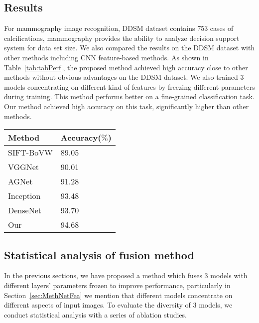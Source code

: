 \subsection{Results}
\label{sec:ExpRes}

For mammography image recognition, DDSM 
dataset contains 753 cases of calcifications, 
mammography provides the ability to analyze 
decision support system for data set size.
We also compared the results 
on the DDSM dataset with other methods 
including CNN feature-based methods. 
As shown in 
Table~\ref{tab:tabPerf},
the proposed method achieved high accuracy 
close to other methods without obvious 
advantages on the DDSM dataset. We also trained 
3 models concentrating on different kind
of features by freezing different 
parameters during training. This method 
performs better on a fine-grained 
classification task. Our method achieved 
high accuracy on this task, significantly 
higher than other methods.

\begin{table*}[!ht]
    \caption{Performance comparing to 
        different methods}
    \label{tab:tabPerf}
    \setlength{\arrayrulewidth}{1.05 pt}
    \renewcommand{\arraystretch}{1.1}
    \begin{tabular*}{1.0\textwidth}{
        @{
            \extracolsep{\fill}
        }ll
    }
        \hline
        Method & Accuracy($\%$) \\
        \hline
        SIFT-BoVW       & 89.05 \\
        VGGNet          & 90.01 \\
        AGNet           & 91.28 \\
        Inception       & 93.48 \\
        DenseNet        & 93.70 \\
        Our             & 94.68 \\
        \hline
    \end{tabular*}
\end{table*}

\subsection{Statistical analysis of fusion method}
\label{ExpSA}

In the previous sections, we have proposed 
a method which fuses 3 models with different 
layers’ parameters frozen to improve 
performance, particularly in 
Section~\ref{sec:MethNetFea} 
we mention that different models 
concentrate on different aspects of input 
images. To evaluate the diversity of 3 
models, we conduct statistical analysis with 
a series of ablation studies.

